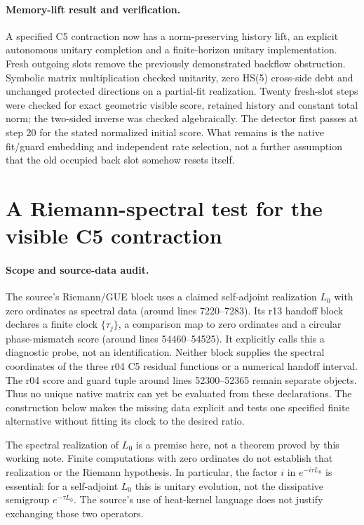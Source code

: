 \documentclass[11pt,a4paper]{article}
\begin{document}
\paragraph{Memory-lift result and verification.}
A specified C5 contraction now has a norm-preserving history lift,
an explicit autonomous unitary completion and a finite-horizon unitary
implementation. Fresh outgoing slots remove the previously demonstrated
backflow obstruction. Symbolic matrix multiplication checked unitarity,
zero HS(5) cross-side debt and unchanged protected directions on a
partial-fit realization. Twenty fresh-slot steps were checked for exact
geometric visible score, retained history and constant total norm; the
two-sided inverse was checked algebraically. The detector first passes
at step 20 for the stated normalized initial score.
What remains is the native fit/guard embedding and independent rate
selection, not a further assumption that the old occupied back slot
somehow resets itself.

\section{A Riemann-spectral test for the visible C5 contraction}
\label{sec:riemann-spectral-c5-test}

\paragraph{Scope and source-data audit.}
The source's Riemann/GUE block uses a claimed self-adjoint realization
$L_0$ with zero ordinates as spectral data (around lines 7220--7283).
Its r13 handoff block declares a finite clock $\{\tau_j\}$, a comparison
map to zero ordinates and a circular phase-mismatch score (around
lines 54460--54525). It explicitly calls this a diagnostic probe, not
an identification. Neither block supplies the spectral coordinates of
the three r04 C5 residual functions or a numerical handoff interval.
The r04 score and guard tuple around lines 52300--52365 remain separate
objects. Thus no unique native matrix can yet be evaluated from these
declarations. The construction below makes the missing data explicit
and tests one specified finite alternative without fitting its clock
to the desired ratio.

The spectral realization of $L_0$ is a premise here, not a theorem
proved by this working note. Finite computations with zero ordinates
do not establish that realization or the Riemann hypothesis. In
particular, the factor $i$ in $e^{-i\tau L_0}$ is essential: for a
self-adjoint $L_0$ this is unitary evolution, not the dissipative
semigroup $e^{-\tau L_0}$. The source's use of heat-kernel language
does not justify exchanging those two operators.
\end{document}
